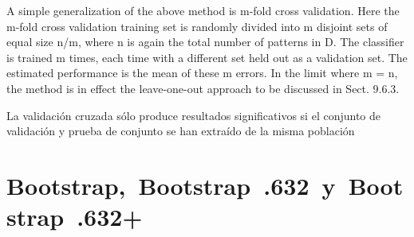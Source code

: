 \documentclass{article}
\begin{document}
A simple generalization of the above method is m-fold cross validation. Here the m-fold
cross
validation
training set is randomly divided into m disjoint sets of equal size n/m, where n is
again the total number of patterns in D. The classifier is trained m times, each
time with a different set held out as a validation set. The estimated performance is
the mean of these m errors. In the limit where m = n, the method is in effect the
leave-one-out approach to be discussed in Sect. 9.6.3.

La validación cruzada sólo produce resultados significativos si el conjunto de validación y prueba de conjunto se han extraído de la misma población
\section{Bootstrap, Bootstrap .632 y Bootstrap .632+}

\newpage 
\nocite{*}

 
\end{document}
